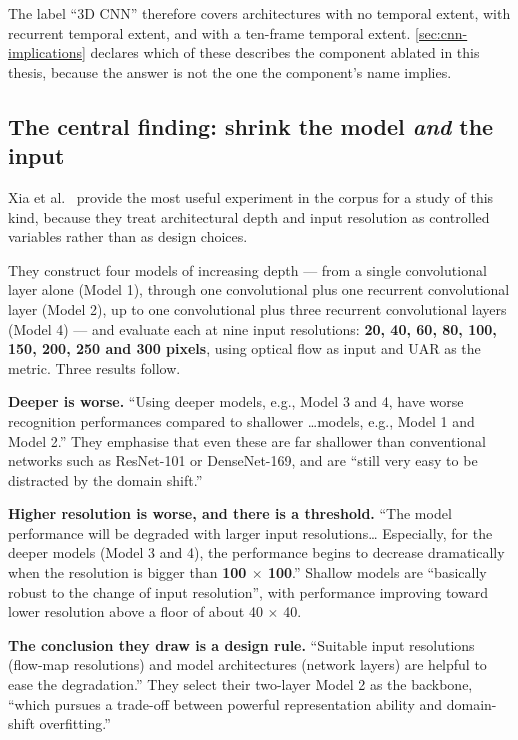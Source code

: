 The label ``3D CNN'' therefore covers architectures with no temporal extent, with recurrent temporal extent, and with a ten-frame temporal extent. \autoref{sec:cnn-implications} declares which of these describes the component ablated in this thesis, because the answer is not the one the component's name implies.

\subsection{The central finding: shrink the model \textit{and} the input}
\label{sec:cnn-shrink}

Xia et al.~\cite{xia2020b} provide the most useful experiment in the corpus for a study of this kind, because they treat architectural depth and input resolution as controlled variables rather than as design choices.

They construct four models of increasing depth --- from a single convolutional layer alone (Model 1), through one convolutional plus one recurrent convolutional layer (Model 2), up to one convolutional plus three recurrent convolutional layers (Model 4) --- and evaluate each at nine input resolutions: \textbf{20, 40, 60, 80, 100, 150, 200, 250 and 300 pixels}, using optical flow as input and UAR as the metric. Three results follow.

\textbf{Deeper is worse.} ``Using deeper models, e.g., Model 3 and 4, have worse recognition performances compared to shallower \ldots models, e.g., Model 1 and Model 2.'' They emphasise that even these are far shallower than conventional networks such as ResNet-101 or DenseNet-169, and are ``still very easy to be distracted by the domain shift.''

\textbf{Higher resolution is worse, and there is a threshold.} ``The model performance will be degraded with larger input resolutions\ldots{} Especially, for the deeper models (Model 3 and 4), the performance begins to decrease dramatically when the resolution is bigger than \textbf{100 $\times$ 100}.'' Shallow models are ``basically robust to the change of input resolution'', with performance improving toward lower resolution above a floor of about 40 $\times$ 40.

\textbf{The conclusion they draw is a design rule.} ``Suitable input resolutions (flow-map resolutions) and model architectures (network layers) are helpful to ease the degradation.'' They select their two-layer Model 2 as the backbone, ``which pursues a trade-off between powerful representation ability and domain-shift overfitting.''

